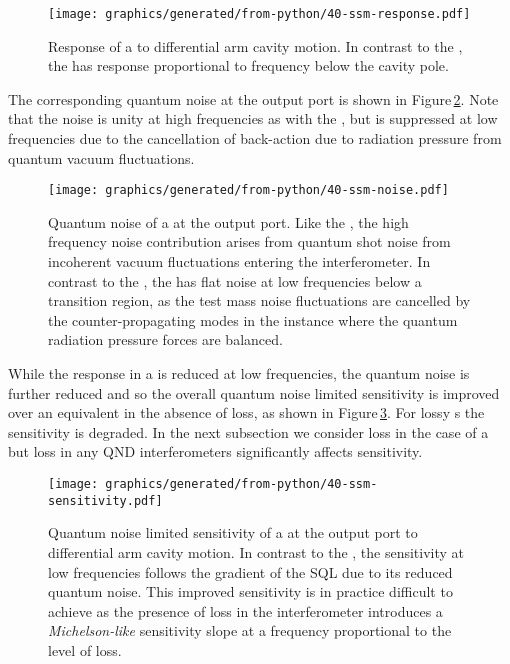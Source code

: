 \begin{figure}
  \centering
  \texttt{[image: graphics/generated/from-python/40-ssm-response.pdf]}
  \caption[Response of a \SSM{} to differential arm cavity motion]{\label{fig:ssm-response}Response of a \SSM{} to differential arm cavity motion. In contrast to the \MI{}, the \SSM{} has response proportional to frequency below the cavity pole.}
\end{figure}

The corresponding quantum noise at the output port is shown in Figure\,\ref{fig:ssm-noise}. Note that the noise is unity at high frequencies as with the \FPMI{}, but is suppressed at low frequencies due to the cancellation of back-action due to radiation pressure from quantum vacuum fluctuations.

\begin{figure}
  \centering
  \texttt{[image: graphics/generated/from-python/40-ssm-noise.pdf]}
  \caption[Quantum noise of a \SSM{} at the output port]{\label{fig:ssm-noise}Quantum noise of a \SSM{} at the output port. Like the \MI{}, the high frequency noise contribution arises from quantum shot noise from incoherent vacuum fluctuations entering the interferometer. In contrast to the \MI{}, the \SSM{} has flat noise at low frequencies below a transition region, as the test mass noise fluctuations are cancelled by the counter-propagating modes in the instance where the quantum radiation pressure forces are balanced.}
\end{figure}

While the response in a \SSM{} is reduced at low frequencies, the quantum noise is further reduced and so the overall quantum noise limited sensitivity is improved over an equivalent \FPMI{} in the absence of loss, as shown in Figure\,\ref{fig:ssm-sensitivity}. For lossy \SM{}s the sensitivity is degraded. In the next subsection we consider loss in the case of a \SSM{} but loss in any \gls{QND} interferometers significantly affects sensitivity.

\begin{figure}
  \centering
  \texttt{[image: graphics/generated/from-python/40-ssm-sensitivity.pdf]}
  \caption[Sensitivity of a \SSM{} at the output port to differential arm cavity motion]{\label{fig:ssm-sensitivity}Quantum noise limited sensitivity of a \SSM{} at the output port to differential arm cavity motion. In contrast to the \MI{}, the \SSM{} sensitivity at low frequencies follows the gradient of the \gls{SQL} due to its reduced quantum noise. This improved sensitivity is in practice difficult to achieve as the presence of loss in the interferometer introduces a \emph{Michelson-like} sensitivity slope at a frequency proportional to the level of loss.}
\end{figure}

